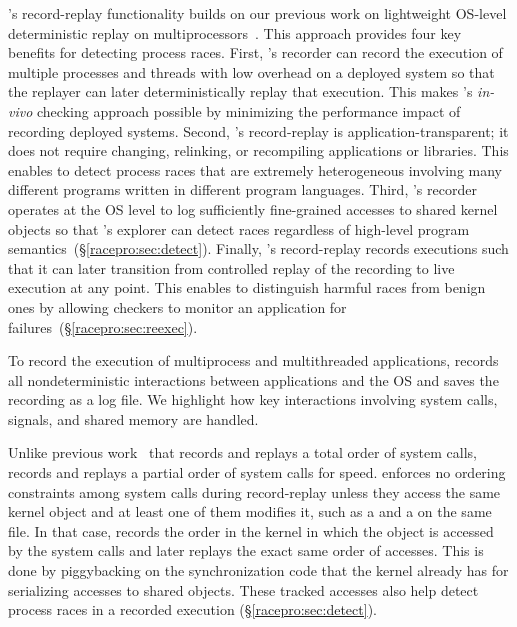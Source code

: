 \racepro's record-replay functionality builds on our previous work on
lightweight OS-level deterministic replay on
multiprocessors~\cite{scribe:sigmetrics10}.  This approach provides four key
benefits for detecting process races.  First, \racepro's recorder can 
record the execution of multiple processes and threads with low overhead
on a deployed system so that the replayer can later deterministically
replay that execution.  This makes \racepro's \emph{in-vivo} checking approach
possible by minimizing the performance impact of recording deployed
systems.  Second, \racepro's record-replay is application-transparent; it
does not require changing, relinking, or recompiling applications or
libraries. This enables \racepro to detect process races that are
extremely heterogeneous involving many different programs written in
different program languages.  Third, \racepro's recorder operates at the
OS level to log sufficiently fine-grained accesses to shared kernel
objects so that \racepro's explorer can detect races regardless of
high-level program semantics~(\S\ref{racepro:sec:detect}).  Finally, \racepro's
record-replay records executions such that it can later transition 
from controlled replay of the recording to live execution at any
point.  This enables \racepro to distinguish harmful races from benign
ones by allowing checkers to monitor an application for
failures~(\S\ref{racepro:sec:reexec}). 

To record the execution of multiprocess and multithreaded
applications, \racepro records all nondeterministic interactions between
applications and the OS and saves the recording as a log file.  We
highlight how key interactions involving system calls, signals, and
shared memory are handled.

  Unlike previous
work~\cite{r2:osdi,srinivasan:flashback} that records and replays a total
order of system calls, \racepro records and replays a partial order of system
calls for speed.  \racepro enforces no ordering constraints among system
calls during record-replay unless they access the same kernel object
and at least one of them modifies it, such as a  and a
 on the same file.  In that case, \racepro records the order in
the kernel in which the object is accessed by the system calls and
later replays the exact same order of accesses.  This is done by 
piggybacking on the synchronization code that the kernel already has
for serializing accesses to shared objects.  These tracked accesses
also help detect process races in a recorded execution
(\S\ref{racepro:sec:detect}). 

